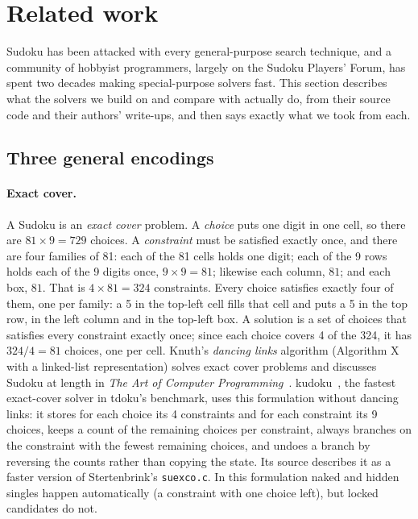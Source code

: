 \documentclass[11pt]{article}
\theoremstyle{definition}
\theoremstyle{plain}
\begin{document}
\section{Related work}
\label{sec:related}
\label{sec:background}

Sudoku has been attacked with every general-purpose search technique, and a community of hobbyist programmers,
largely on the Sudoku Players' Forum, has spent two decades making special-purpose solvers fast. This section
describes what the solvers we build on and compare with actually do, from their source code and their authors'
write-ups, and then says exactly what we took from each.

\subsection{Three general encodings}

\paragraph{Exact cover.} A Sudoku is an \emph{exact cover} problem. A \emph{choice} puts one digit in one cell, so
there are $81\times 9=729$ choices. A \emph{constraint} must be satisfied exactly once, and there are four families of
81: each of the 81 cells holds one digit; each of the 9 rows holds each of the 9 digits once, $9\times 9=81$; likewise
each column, $81$; and each box, $81$. That is $4\times 81=324$ constraints. Every choice satisfies exactly four of
them, one per family: a 5 in the top-left cell fills that cell and puts a 5 in the top row, in the left column and in
the top-left box. A solution
is a set of choices that satisfies every constraint exactly once; since each choice covers 4 of the 324, it has
$324/4=81$ choices, one per cell. Knuth's \emph{dancing links} algorithm (Algorithm X
with a linked-list representation) solves exact cover problems and discusses Sudoku at length in
\emph{The Art of Computer Programming}~\cite{knuth2022taocp4b}. kudoku~\cite{attractivechaos2011kudoku}, the fastest
exact-cover solver in tdoku's benchmark, uses this formulation without dancing links: it stores for each choice its 4
constraints and for each constraint its 9 choices, keeps a count of the remaining choices per constraint, always
branches on the constraint with the fewest remaining choices, and undoes a branch by reversing the counts rather than
copying the state. Its source describes it as a faster version of Stertenbrink's \texttt{suexco.c}. In this
formulation naked and hidden singles happen automatically (a constraint with one choice left), but locked candidates
do not.
\end{document}
